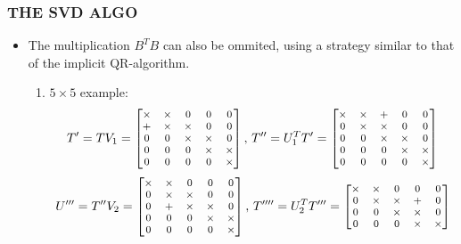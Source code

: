 \documentclass[a4paper,8pt]{beamer} %
\newcommand{\smatrix}[1]{\left[\begin{matrix} #1 \end{matrix}\right]}
\begin{document}
\begin{frame}%
	\frametitle{THE SVD ALGO}
	\begin{itemize}
		\item The multiplication $B^TB$ can also be ommited, using a strategy similar to that of the implicit QR-algorithm.
			\begin{enumerate}
				\item $5\times 5$ example:
					\begin{equation}
						\begin{footnotesize}
							T'= T V_1= 
							\smatrix
							{
								\times 	& \times & 0 & 0 & 0   \\
								+ 	& \times & \times & 0 & 0   \\
								0 & 0 & \times & \times & 0   \\
								0 & 0 & 0 & \times & \times     \\
								0 & 0 & 0 & 0 & \times    \\
							}
							,\,
							T''=  U_1^T T'  = 
							\smatrix
							{
								\times 	& \times & + & 0 & 0   \\
								0	& \times & \times & 0 & 0   \\
								0 	& 0 & \times & \times & 0    \\
								0 & 0 & 0 & \times & \times   \\
								0 & 0 & 0 & 0 & \times  \\
							}
						\end{footnotesize}
					\end{equation}
					\begin{equation}
						\begin{footnotesize}
							U'''= T'' V_2 = 
							\smatrix
							{
								\times 	& \times & 0 & 0 & 0   \\
								0 	& \times & \times & 0 & 0   \\
								0 	& + & \times & \times & 0\\
								0 & 0 & 0 & \times & \times   \\
								0 & 0 & 0 & 0 & \times  \\
							}
							,\,
							T''''= U_2^TT'''= 
							\smatrix
							{
								\times 	& \times & 0 & 0 & 0   \\
								0 	& \times & \times & + & 0   \\
								0 	& 0 & \times & \times & 0    \\
								0 & 0 & 0 & \times & \times   \\
}
\end{footnotesize}
\end{equation}
\end{enumerate}
\end{itemize}
\end{frame}
\end{document}

